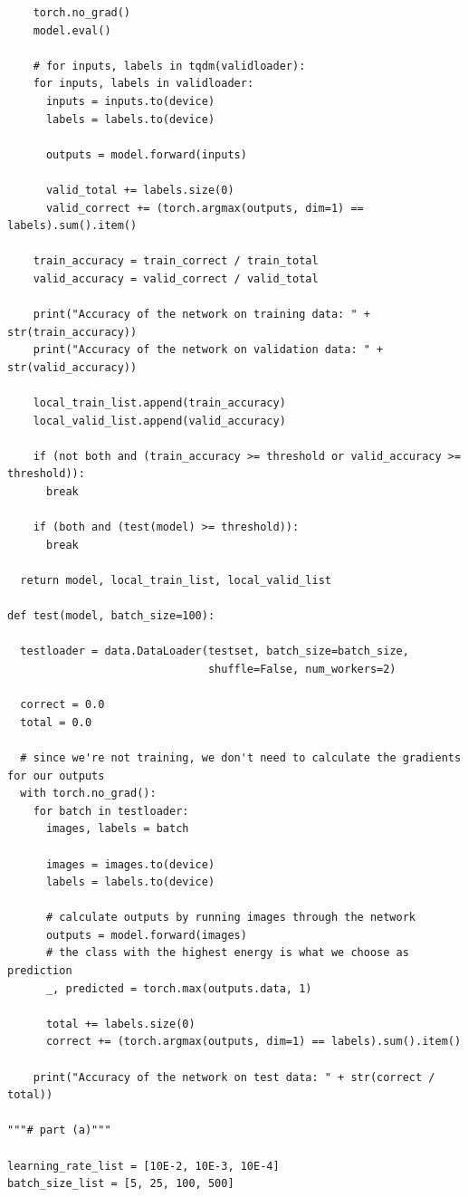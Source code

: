 \documentclass{article}
\newcommand{\1}{\mathbf{1}}
\begin{document}
{\begin{verbatim}
    torch.no_grad()
    model.eval()

    # for inputs, labels in tqdm(validloader):
    for inputs, labels in validloader:
      inputs = inputs.to(device)
      labels = labels.to(device)

      outputs = model.forward(inputs)
        
      valid_total += labels.size(0)
      valid_correct += (torch.argmax(outputs, dim=1) == labels).sum().item()

    train_accuracy = train_correct / train_total
    valid_accuracy = valid_correct / valid_total

    print("Accuracy of the network on training data: " + str(train_accuracy))
    print("Accuracy of the network on validation data: " + str(valid_accuracy))

    local_train_list.append(train_accuracy)
    local_valid_list.append(valid_accuracy)
    
    if (not both and (train_accuracy >= threshold or valid_accuracy >= threshold)):
      break
    
    if (both and (test(model) >= threshold)):
      break

  return model, local_train_list, local_valid_list

def test(model, batch_size=100):

  testloader = data.DataLoader(testset, batch_size=batch_size,
                               shuffle=False, num_workers=2)

  correct = 0.0
  total = 0.0

  # since we're not training, we don't need to calculate the gradients for our outputs
  with torch.no_grad():
    for batch in testloader:
      images, labels = batch

      images = images.to(device)
      labels = labels.to(device)

      # calculate outputs by running images through the network 
      outputs = model.forward(images)
      # the class with the highest energy is what we choose as prediction
      _, predicted = torch.max(outputs.data, 1)

      total += labels.size(0)
      correct += (torch.argmax(outputs, dim=1) == labels).sum().item()

    print("Accuracy of the network on test data: " + str(correct / total))

"""# part (a)"""

learning_rate_list = [10E-2, 10E-3, 10E-4]
batch_size_list = [5, 25, 100, 500]


\end{verbatim}}
\end{document}
